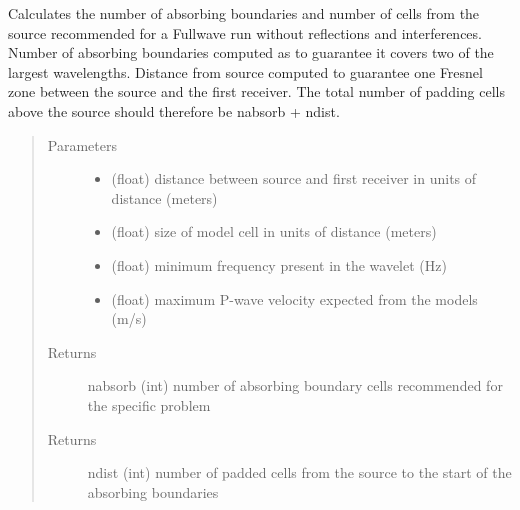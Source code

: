 \documentclass[letterpaper,10pt,english]{sphinxmanual}
\begin{document}
\begin{fulllineitems}
\label{\detokenize{index:fullwaveqc.geom.boundarycalc}}
Calculates the number of absorbing boundaries and number of cells from the source recommended for
a Fullwave run without reflections and interferences. Number of absorbing boundaries computed as
to guarantee it covers two of the largest wavelengths. Distance from source computed to guarantee
one Fresnel zone between the source and the first receiver. The total number of padding cells above
the source should therefore be nabsorb + ndist.
\begin{quote}\begin{description}
\item[{Parameters}] \leavevmode\begin{itemize}
\item {} 
 \textendash{} (float) distance between source and first receiver in units of distance (meters)

\item {} 
 \textendash{} (float) size of model cell in units of distance (meters)

\item {} 
 \textendash{} (float) minimum frequency present in the wavelet (Hz)

\item {} 
 \textendash{} (float) maximum P-wave velocity expected from the models (m/s)

\end{itemize}

\item[{Returns}] \leavevmode
nabsorb (int)   number of absorbing boundary cells recommended for the specific problem

\item[{Returns}] \leavevmode
ndist   (int)   number of padded cells from the source to the start of the absorbing boundaries

\end{description}\end{quote}

\end{fulllineitems}

\end{document}
